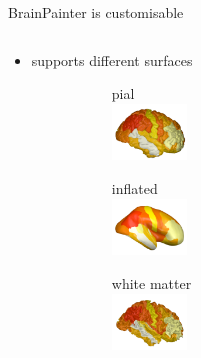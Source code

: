 \documentclass[10pt,xcolor=table,aspectratio=169]{beamer}
\begin{document}
\begin{frame}[t]{BrainPainter is customisable}
\begin{columns}[t]
\begin{column}{0.5\textwidth}
\begin{itemize}
   \item supports different surfaces
   \begin{figure}
    \fontsize{8}{10}\selectfont
     \begin{subfigure}{0.27\textwidth}
      \centering
      pial\\
      \includegraphics[height=1.5cm]{images/DK_output/Image_2_cortical-outer.png}
     \end{subfigure}
     \begin{subfigure}{0.27\textwidth}
      \centering
      inflated\\
      \includegraphics[height=1.5cm]{images/DK_output_inflated/Image_2_cortical-outer.png}
     \end{subfigure}
     \begin{subfigure}{0.27\textwidth}
      \centering
      white matter\\
      \includegraphics[height=1.5cm]{images/DK_output_white/Image_2_cortical-outer.png}
     \end{subfigure}

   \end{figure}
   
   

\end{itemize}
 

\end{column}
\begin{column}{0.5\textwidth}  %



\end{column}
\end{columns}
\end{frame}
\end{document}

